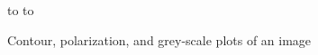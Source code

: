 \begin{figure}
\centering
\vfill
\vspace{6pt}
\hbox to 
\vspace{27pt}
\vspace{6pt}
\hbox to 
\caption[Contour and grey-scale plots of an image]{Contour,
polarization, and grey-scale plots of an image}
\label{fig:imageplot}
\end{figure}

